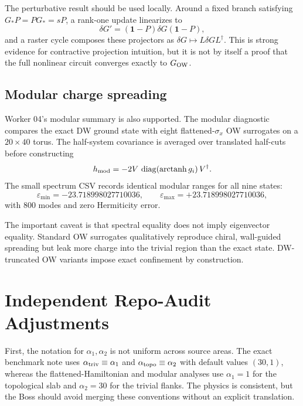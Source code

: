 \documentclass[aps,prb,onecolumn,nofootinbib,superscriptaddress]{revtex4-2}
\newcommand{\Id}{\mathbf{1}}
\newcommand{\GO}{G_{\rm OW}}
\begin{document}
The perturbative result should be used locally.  Around a fixed branch satisfying $G_*P=PG_*=sP$, a rank-one update linearizes to
\begin{equation}
\delta G'=(\Id-P)\delta G(\Id-P),
\end{equation}
and a raster cycle composes these projectors as $\delta G\mapsto L\delta G L^\dagger$.  This is strong evidence for contractive projection intuition, but it is not by itself a proof that the full nonlinear circuit converges exactly to $\GO$.

\subsection{Modular charge spreading}

Worker 04's modular summary is also supported.  The modular diagnostic compares the exact DW ground state with eight flattened-$\sigma_x$ OW surrogates on a $20\times40$ torus.  The half-system covariance is averaged over translated half-cuts before constructing
\begin{equation}
h_{\rm mod}=-2V\,\operatorname{diag}(\operatorname{arctanh}g_i)\,V^\dagger .
\end{equation}
The small spectrum CSV records identical modular ranges for all nine states:
\begin{equation}
\varepsilon_{\min}=-23.718998027710036,\qquad
\varepsilon_{\max}=+23.718998027710036,
\end{equation}
with $800$ modes and zero Hermiticity error.

The important caveat is that spectral equality does not imply eigenvector equality.  Standard OW surrogates qualitatively reproduce chiral, wall-guided spreading but leak more charge into the trivial region than the exact state.  DW-truncated OW variants impose exact confinement by construction.

\section{Independent Repo-Audit Adjustments}

First, the notation for $\alpha_1,\alpha_2$ is not uniform across source areas.  The exact benchmark note uses $\alpha_{\rm triv}\equiv\alpha_1$ and $\alpha_{\rm topo}\equiv\alpha_2$ with default values $(30,1)$, whereas the flattened-Hamiltonian and modular analyses use $\alpha_1=1$ for the topological slab and $\alpha_2=30$ for the trivial flanks.  The physics is consistent, but the Boss should avoid merging these conventions without an explicit translation.
\end{document}
